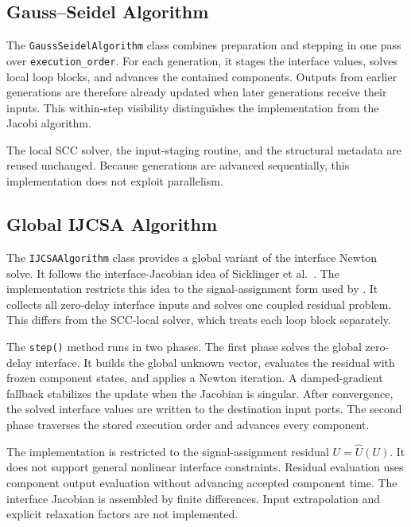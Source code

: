 
\subsection{Gauss--Seidel Algorithm}
\label{sec:impl_algorithms_gs}

The \texttt{GaussSeidelAlgorithm} class combines preparation and stepping in one pass over \texttt{execution\_order}.
For each generation, it stages the interface values, solves local loop blocks, and advances the contained components.
Outputs from earlier generations are therefore already updated when later generations receive their inputs.
This within-step visibility distinguishes the implementation from the Jacobi algorithm.

The local \ac{SCC} solver, the input-staging routine, and the structural metadata are reused unchanged.
Because generations are advanced sequentially, this implementation does not exploit parallelism.

\subsection{Global IJCSA Algorithm}
\label{sec:impl_algorithms_ijcsa}

The \texttt{IJCSAAlgorithm} class provides a global variant of the interface Newton solve.
It follows the interface-Jacobian idea of Sicklinger et al.~\cite{sicklinger_interface_2014}.
The implementation restricts this idea to the signal-assignment form used by \syssimx{}.
It collects all zero-delay interface inputs and solves one coupled residual problem.
This differs from the \ac{SCC}-local solver, which treats each loop block separately.

The \texttt{step()} method runs in two phases.
The first phase solves the global zero-delay interface.
It builds the global unknown vector, evaluates the residual with frozen component states, and applies a Newton iteration.
A damped-gradient fallback stabilizes the update when the Jacobian is singular.
After convergence, the solved interface values are written to the destination input ports.
The second phase traverses the stored execution order and advances every component.

The implementation is restricted to the signal-assignment residual $U=\widehat{U}(U)$.
It does not support general nonlinear interface constraints.
Residual evaluation uses component output evaluation without advancing accepted component time.
The interface Jacobian is assembled by finite differences.
Input extrapolation and explicit relaxation factors are not implemented.

